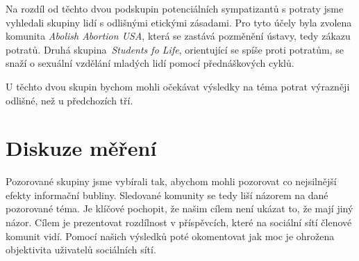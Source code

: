 \documentclass[12pt, a4paper]{article}
\numberwithin{equation}{section} 	%
\begin{document}
Na rozdíl od těchto dvou podskupin potenciálních sympatizantů s potraty jsme vyhledali skupiny lidí s odlišnými etickými zásadami. Pro tyto účely byla zvolena komunita \textit{Abolish Abortion USA}, která se zastává pozměnění ústavy, tedy zákazu potratů. Druhá skupina~\textit{Students fo Life}, orientující se spíše proti potratům, se snaží o sexuální vzdělání mladých lidí pomocí přednáškových cyklů.  

U těchto dvou skupin bychom mohli očekávat výsledky na téma potrat výrazněji odlišné, než u předchozích tří.

\newpage
\section{Diskuze měření}
\noindent Pozorované skupiny jsme vybírali tak, abychom mohli pozorovat co nejsilnější efekty informační bubliny. Sledované komunity se tedy liší názorem na dané pozorované téma.  Je klíčové pochopit, že našim cílem není ukázat to, že mají jiný názor. Cílem je prezentovat rozdílnost v příspěvcích, které na sociální sítí členové komunit vidí. Pomocí našich výsledků poté okomentovat jak moc je ohrožena objektivita uživatelů sociálních sítí.
\end{document}
